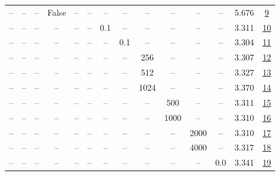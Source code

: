\begin{table}[H]
\begin{tabular}{cccccccccccccc}
-- & -- & -- & False & -- & -- & -- & -- & -- & -- & -- & -- & 5.676 & \href{https://wandb.ai/stanford-mercury/optimizer-scaling/runs/sweep-130m-10B-kron1d44fclr0.002-wd0.5-b10.95-plr0.2-pis1-gn1-no-70d4aa}{9} \\
-- & -- & -- & -- & -- & -- & 0.1 & -- & -- & -- & -- & -- & 3.311 & \href{https://wandb.ai/stanford-mercury/optimizer-scaling/runs/sweep-130m-10B-kronb95d56lr0.002-wd0.5-b10.95-plr0.1-pis1-gn1-no-75ac83}{10} \\
-- & -- & -- & -- & -- & -- & -- & 0.1 & -- & -- & -- & -- & 3.304 & \href{https://wandb.ai/stanford-mercury/optimizer-scaling/runs/sweep-130m-10B-kron5b495flr0.002-wd0.5-b10.95-plr0.2-pis1-gn1-no-989d60}{11} \\
-- & -- & -- & -- & -- & -- & -- & -- & 256 & -- & -- & -- & 3.307 & \href{https://wandb.ai/stanford-mercury/optimizer-scaling/runs/sweep-130m-10B-kron45d4b7lr0.002-wd0.5-b10.95-plr0.2-pis1-gn1-no-cdf266}{12} \\
-- & -- & -- & -- & -- & -- & -- & -- & 512 & -- & -- & -- & 3.327 & \href{https://wandb.ai/stanford-mercury/optimizer-scaling/runs/sweep-130m-10B-kronf8119alr0.002-wd0.5-b10.95-plr0.2-pis1-gn1-no-e1c458}{13} \\
-- & -- & -- & -- & -- & -- & -- & -- & 1024 & -- & -- & -- & 3.370 & \href{https://wandb.ai/stanford-mercury/optimizer-scaling/runs/sweep-130m-10B-kron80879elr0.002-wd0.5-b10.95-plr0.2-pis1-gn1-no-214b96}{14} \\
-- & -- & -- & -- & -- & -- & -- & -- & -- & 500 & -- & -- & 3.311 & \href{https://wandb.ai/stanford-mercury/optimizer-scaling/runs/sweep-130m-10B-kron9eb75blr0.002-wd0.5-b10.95-plr0.2-pis1-gn1-no-294485}{15} \\
-- & -- & -- & -- & -- & -- & -- & -- & -- & 1000 & -- & -- & 3.310 & \href{https://wandb.ai/stanford-mercury/optimizer-scaling/runs/sweep-130m-10B-kron2c6da9lr0.002-wd0.5-b10.95-plr0.2-pis1-gn1-no-f705c8}{16} \\
-- & -- & -- & -- & -- & -- & -- & -- & -- & -- & 2000 & -- & 3.310 & \href{https://wandb.ai/stanford-mercury/optimizer-scaling/runs/sweep-130m-10B-kron7e7565lr0.002-wd0.5-b10.95-plr0.2-pis1-gn1-no-5425b1}{17} \\
-- & -- & -- & -- & -- & -- & -- & -- & -- & -- & 4000 & -- & 3.317 & \href{https://wandb.ai/stanford-mercury/optimizer-scaling/runs/sweep-130m-10B-kron35a609lr0.002-wd0.5-b10.95-plr0.2-pis1-gn1-no-42f16b}{18} \\
-- & -- & -- & -- & -- & -- & -- & -- & -- & -- & -- & 0.0 & 3.341 & \href{https://wandb.ai/stanford-mercury/optimizer-scaling/runs/sweep-130m-10B-kronf6cdb4lr0.002-wd0.0-b10.95-plr0.2-pis1-gn1-no-aeed18}{19} \\

\end{tabular}
\end{table}
